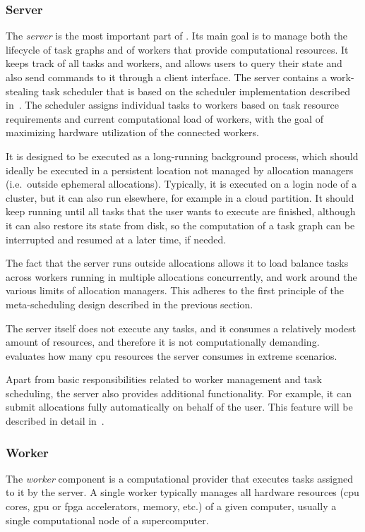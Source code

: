 \subsubsection*{Server}
The \emph{server} is the most important part of \hyperqueue{}. Its main goal is
to manage both the lifecycle of task graphs and of workers that provide computational resources. It
keeps track of all tasks and workers, and allows users to query their state and also send commands
to it through a client interface. The server contains a work-stealing task scheduler that is based
on the \rsds{} scheduler implementation described in~. The
scheduler assigns individual tasks to workers based on task resource requirements and current
computational load of workers, with the goal of maximizing hardware utilization of the connected
workers.

It is designed to be executed as a long-running background process, which should ideally be
executed in a persistent location not managed by allocation managers (i.e.\ outside ephemeral
allocations). Typically, it is executed on a login node of a cluster, but it can also run
elsewhere, for example in a cloud partition. It should keep running until all tasks that the user
wants to execute are finished, although it can also restore its state from disk, so the computation
of a task graph can be interrupted and resumed at a later time, if needed.

The fact that the server runs outside allocations allows it to load balance tasks across workers
running in multiple allocations concurrently, and work around the various limits of allocation
managers. This adheres to the first principle of the meta-scheduling design described in the
previous section.

The server itself does not execute any tasks, and it consumes a relatively modest amount of
resources, and therefore it is not computationally demanding.~ evaluates how
many \gls{cpu} resources the server consumes in extreme scenarios.

Apart from basic responsibilities related to worker management and task scheduling, the server also
provides additional functionality. For example, it can submit allocations fully automatically on
behalf of the user. This feature will be described in detail in~.

\subsubsection*{Worker}
The \emph{worker} component is a computational provider that executes tasks assigned to
it by the server. A single worker typically manages all hardware resources (\gls{cpu}
cores, \gls{gpu} or \gls{fpga} accelerators, memory, etc.) of a given
computer, usually a single computational node of a supercomputer.

